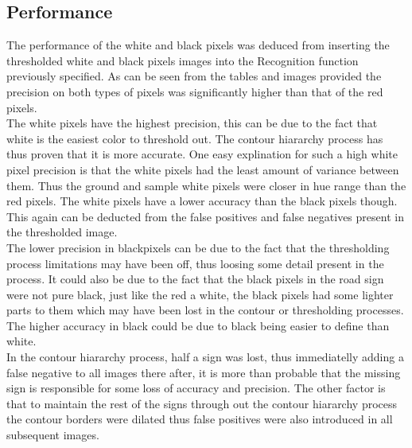 \documentclass{article}
\begin{document}
\subsection{Performance}\label{sec:intro}
The performance of the white and black pixels was deduced from inserting the thresholded white and black pixels images into the Recognition function previously specified. As can be seen from the tables and images provided the precision on both types of pixels was significantly higher than that of the red pixels.\\
The white pixels have the highest precision, this can be due to the fact that white is the easiest color to threshold out. The contour hiararchy process has thus proven that it is more accurate. One easy explination for such a high white pixel precision is that the white pixels had the least amount of variance between them. Thus the ground and sample white pixels were closer in hue range than the red pixels. The white pixels have a lower accuracy than the black pixels though. This again can be deducted from the false positives and false negatives present in the thresholded image.\\
The lower precision in blackpixels can be due to the fact that the thresholding process limitations may have been off, thus loosing some detail present in the process. It could also be due to the fact that the black pixels in the road sign were not pure black, just like the red a white, the black pixels had some lighter parts to them which may have been lost in the contour or thresholding processes. The higher accuracy in black could be due to black being easier to define than white.\\
In the contour hiararchy process, half a sign was lost, thus immediatelly adding a false negative to all images there after, it is more than probable that the missing sign is responsible for some loss of accuracy and precision. The other factor is that to maintain the rest of the signs through out the contour hiararchy process the contour borders were dilated thus false positives were also introduced in all subsequent images.
\end{document}
